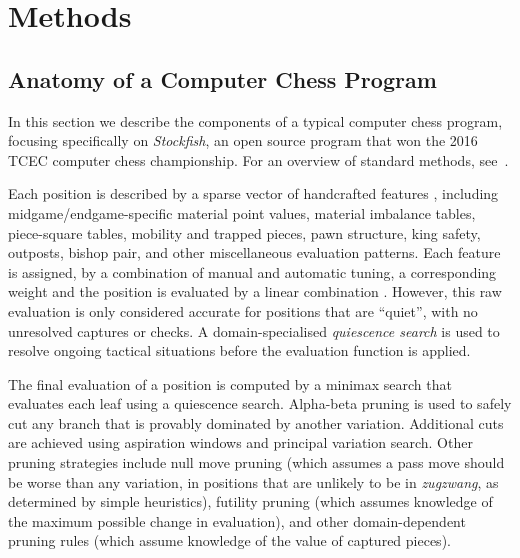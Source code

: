 \documentclass[12pt]{article}
\begin{document}



\newpage

\setcounter{table}{0}
\renewcommand{\thetable}{S\arabic{table}}\setcounter{figure}{0}
\renewcommand{\thefigure}{S\arabic{figure}}

\section*{Methods}

\subsection*{Anatomy of a Computer Chess Program}

In this section we describe the components of a typical computer chess program, focusing specifically on \emph{Stockfish}\cite{Stockfish}, an open source program that won the 2016 TCEC computer chess championship. 
For an overview of standard methods, see~\cite{Marsland87}.

Each position  is described by a sparse vector of 
handcrafted features , including midgame/endgame-specific material point values, material imbalance tables, piece-square tables, mobility and trapped pieces, pawn structure, king safety, outposts, bishop pair, and other miscellaneous evaluation patterns.
Each feature  is assigned, by a combination of manual and automatic tuning, a corresponding weight  and the position is evaluated by a linear combination . However, this raw evaluation is only considered accurate for positions that are ``quiet'', with no unresolved captures or checks. A domain-specialised \emph{quiescence search} is used to resolve ongoing tactical situations before the evaluation function is applied.

The final evaluation of a position  is computed by a minimax search that evaluates each leaf using a quiescence search. Alpha-beta pruning is used to safely cut any branch that is provably dominated by another variation. Additional cuts are achieved using aspiration windows and principal variation search.
Other pruning strategies include null move pruning (which assumes a pass move should be worse than any variation, in positions that are unlikely to be in \emph{zugzwang}, as determined by simple heuristics), futility pruning (which assumes knowledge of the maximum possible change in evaluation), and other domain-dependent pruning rules (which assume knowledge of the value of captured pieces).
\end{document}
